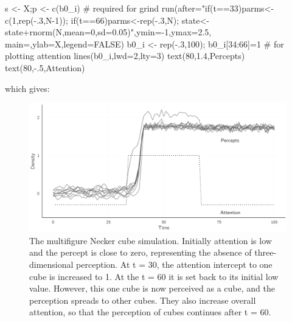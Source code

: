 \documentclass[
  a4paper,
  DIV=11,
  numbers=noendperiod]{scrreprt}
\newenvironment{Shaded}{\begin{snugshade}}{\end{snugshade}}
\newcommand{\AttributeTok}[1]{\textcolor[rgb]{0.40,0.45,0.13}{#1}}
\newcommand{\CommentTok}[1]{\textcolor[rgb]{0.37,0.37,0.37}{#1}}
\newcommand{\ConstantTok}[1]{\textcolor[rgb]{0.56,0.35,0.01}{#1}}
\newcommand{\DecValTok}[1]{\textcolor[rgb]{0.68,0.00,0.00}{#1}}
\newcommand{\FloatTok}[1]{\textcolor[rgb]{0.68,0.00,0.00}{#1}}
\newcommand{\FunctionTok}[1]{\textcolor[rgb]{0.28,0.35,0.67}{#1}}
\newcommand{\NormalTok}[1]{\textcolor[rgb]{0.00,0.23,0.31}{#1}}
\newcommand{\OtherTok}[1]{\textcolor[rgb]{0.00,0.23,0.31}{#1}}
\newcommand{\SpecialCharTok}[1]{\textcolor[rgb]{0.37,0.37,0.37}{#1}}
\newcommand{\StringTok}[1]{\textcolor[rgb]{0.13,0.47,0.30}{#1}}
\begin{document}
\begin{Shaded}
\begin{Highlighting}[]
\NormalTok{s }\OtherTok{\textless{}{-}}\NormalTok{ X;p }\OtherTok{\textless{}{-}} \FunctionTok{c}\NormalTok{(b0\_i) }\CommentTok{\# required for grind}
\FunctionTok{run}\NormalTok{(}\AttributeTok{after=}\StringTok{"if(t==33)parms\textless{}{-}c(1,rep({-}.3,N{-}1));}
\StringTok{           if(t==66)parms\textless{}{-}rep({-}.3,N);}
\StringTok{           state\textless{}{-}state+rnorm(N,mean=0,sd=0.05)"}\NormalTok{,}\AttributeTok{ymin=}\SpecialCharTok{{-}}\DecValTok{1}\NormalTok{,}\AttributeTok{ymax=}\FloatTok{2.5}\NormalTok{,}
            \AttributeTok{main=}\StringTok{\textquotesingle{}\textquotesingle{}}\NormalTok{,}\AttributeTok{ylab=}\StringTok{\textquotesingle{}X\textquotesingle{}}\NormalTok{,}\AttributeTok{legend=}\ConstantTok{FALSE}\NormalTok{)}
\NormalTok{b0\_i }\OtherTok{\textless{}{-}} \FunctionTok{rep}\NormalTok{(}\SpecialCharTok{{-}}\NormalTok{.}\DecValTok{3}\NormalTok{,}\DecValTok{100}\NormalTok{); b0\_i[}\DecValTok{34}\SpecialCharTok{:}\DecValTok{66}\NormalTok{]}\OtherTok{=}\DecValTok{1} \CommentTok{\# for plotting attention}
\FunctionTok{lines}\NormalTok{(b0\_i,}\AttributeTok{lwd=}\DecValTok{2}\NormalTok{,}\AttributeTok{lty=}\DecValTok{3}\NormalTok{)}
\FunctionTok{text}\NormalTok{(}\DecValTok{80}\NormalTok{,}\FloatTok{1.4}\NormalTok{,}\StringTok{\textquotesingle{}Percepts\textquotesingle{}}\NormalTok{)}
\FunctionTok{text}\NormalTok{(}\DecValTok{80}\NormalTok{,}\SpecialCharTok{{-}}\NormalTok{.}\DecValTok{5}\NormalTok{,}\StringTok{\textquotesingle{}Attention\textquotesingle{}}\NormalTok{)}
\end{Highlighting}
\end{Shaded}

which gives:

\begin{figure}

{\centering \includegraphics{media/ch4n/fig-ch4n-img19-old-67.png}

}

\caption{\label{fig-ch4n-img19-old-67}The multifigure Necker cube
simulation. Initially attention is low and the percept is close to zero,
representing the absence of three-dimensional perception. At t = 30, the
attention intercept to one cube is increased to 1. At the t = 60 it is
set back to its initial low value. However, this one cube is now
perceived as a cube, and the perception spreads to other cubes. They
also increase overall attention, so that the perception of cubes
continues after t = 60.}

\end{figure}
\end{document}
